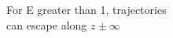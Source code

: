 \documentclass[preview]{standalone}
\begin{document}
For E greater than 1, trajectories\\can escape along $z\pm\infty$\\
\end{document}
